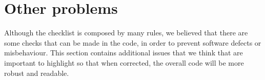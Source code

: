 \newpage
\section{Other problems}
Although the checklist is composed by many rules, we believed that there are some checks that can be made in the code, in order to prevent software defects or misbehaviour. This section contains additional issues that we think that are important to highlight so that when corrected, the overall code will be more robust and readable.